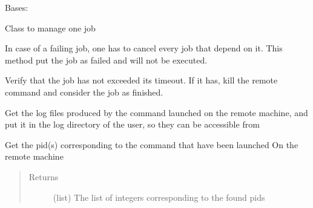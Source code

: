 \documentclass[a4paper,10pt,english]{sphinxmanual}
\begin{document}
\begin{fulllineitems}
\label{\detokenize{apidoc_commands/commands:commands.jobs.Job}}
Bases: 

Class to manage one job

\begin{fulllineitems}
\label{\detokenize{apidoc_commands/commands:commands.jobs.Job.cancel}}
In case of a failing job, one has to cancel every job that depend on it.
This method put the job as failed and will not be executed.

\end{fulllineitems}


\begin{fulllineitems}
\label{\detokenize{apidoc_commands/commands:commands.jobs.Job.check_time}}
Verify that the job has not exceeded its timeout.
If it has, kill the remote command and consider the job as finished.

\end{fulllineitems}


\begin{fulllineitems}
\label{\detokenize{apidoc_commands/commands:commands.jobs.Job.get_log_files}}
Get the log files produced by the command launched 
on the remote machine, and put it in the log directory of the user,
so they can be accessible from

\end{fulllineitems}


\begin{fulllineitems}
\label{\detokenize{apidoc_commands/commands:commands.jobs.Job.get_pids}}
Get the pid(s) corresponding to the command that have been launched
On the remote machine
\begin{quote}\begin{description}
\item[{Returns}] \leavevmode
(list) The list of integers corresponding to the found pids


\end{description}
\end{quote}
\end{fulllineitems}
\end{fulllineitems}
\end{document}
